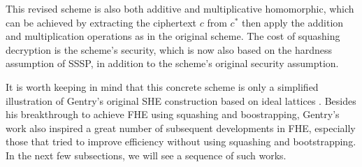 \documentclass[../main.tex]{subfiles}
\begin{document}
This revised scheme is also both additive and multiplicative homomorphic, which can be achieved by extracting the ciphertext $c$ from $c^*$ then apply the addition and multiplication operations as in the original scheme. The cost of squashing decryption is the scheme's security, which is now also based on the hardness assumption of SSSP, in addition to the scheme's original security assumption. 

It is worth keeping in mind that this concrete scheme is only a simplified illustration of Gentry's original SHE construction based on ideal lattices \cite{gentry2009fully}. Besides his breakthrough to achieve FHE using squashing and boostrapping, Gentry's work also inspired a great number of subsequent developments in FHE, especially those that tried to improve efficiency without using squashing and bootstrapping. In the next few subsections, we will see a sequence of such works.  



\end{document}
